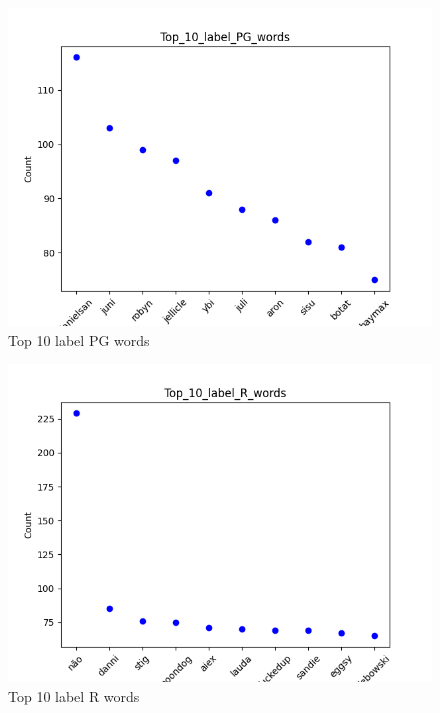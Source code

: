 \documentclass[a4paper]{article}
\begin{document}
\begin{figure}[ht]
    \centering
    \includegraphics[width=1\textwidth]{../stats/Top_10_label_PG_words.png}
    \caption{Top 10 label PG words}
\end{figure}

\begin{figure}[ht]
    \centering
    \includegraphics[width=1\textwidth]{../stats/Top_10_label_R_words.png}
    \caption{Top 10 label R words}
\end{figure}
\end{document}
